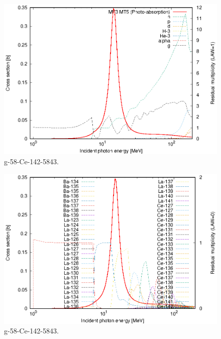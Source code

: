 \begin{figure}
 \includegraphics[width=\linewidth]{eps/g_58-Ce-142_5843.eps}
  \caption{g-58-Ce-142-5843.}
\end{figure}
\begin{figure}
 \includegraphics[width=\linewidth]{eps-law0/g_58-Ce-142_5843.eps}
 \caption{g-58-Ce-142-5843.}
\end{figure}
\newpage \clearpage


